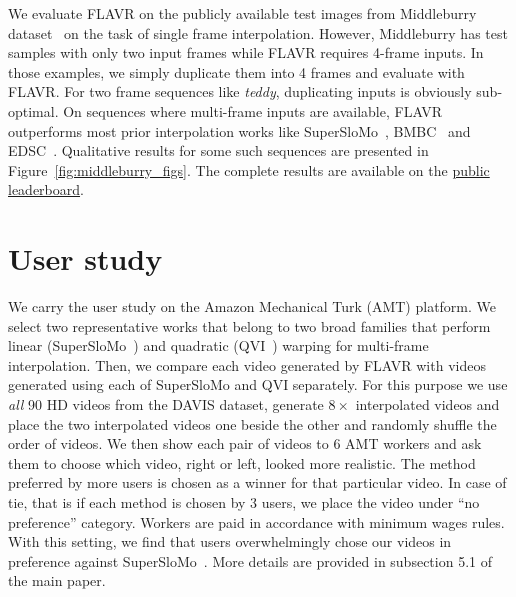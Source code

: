 \documentclass[10pt,twocolumn,letterpaper]{article}
\newcommand{\figref}[1]{Figure~\ref{#1}}
\newcommand{\red}[1]{{#1}}
\newcommand{\Ours}{FLAVR}
\newcommand{\twox}{$2\times$}
\newcommand{\eightx}{$8\times$}
\begin{document}
\begin{figure*}[t]
\begin{center}
    \end{center}
    \caption{Interpolation results for \twox{} interpolation on Middleburry test set. The leftmost images in each row repesent the overlayed inputs. The first row in each set represents the interpolated frame, while the second row shows the error maps with respect to the ground truth. IE shows the interpolation error of the method. The interpolation errors for all the baselines are reported on the \href{https://vision.middlebury.edu/flow/eval/results/results-i1.php}{official leaderboard}.}
    \label{fig:middleburry_figs}
    \vspace{-6pt}
\end{figure*} \red{We evaluate FLAVR on the publicly available test images from Middleburry dataset~\cite{scharstein2014high} on the task of single frame interpolation. However, Middleburry has test samples with only two input frames while FLAVR requires 4-frame inputs. In those examples, we simply duplicate them into 4 frames and evaluate with FLAVR. For two frame sequences like \textit{teddy}, duplicating inputs is obviously sub-optimal. On sequences where multi-frame inputs are available, FLAVR outperforms most prior interpolation works like SuperSloMo~\cite{jiang2018super}, BMBC~\cite{park2020bmbc} and EDSC~\cite{cheng2020multiple}. Qualitative results for some such sequences are presented in \figref{fig:middleburry_figs}. 
The complete results are available on the \href{https://vision.middlebury.edu/flow/eval/results/results-i1.php}{public leaderboard}}.

\section{User study}
\label{appendix:user_study}


We carry the user study on the Amazon Mechanical Turk (AMT) platform. We select two representative works that belong to two broad families that perform linear (SuperSloMo~\cite{jiang2018super}) and quadratic (QVI~\cite{xu2019quadratic}) warping for multi-frame interpolation. Then, we compare each video generated by \Ours{} with videos generated using each of SuperSloMo and QVI separately. For this purpose we use \emph{all} 90 HD videos from the DAVIS dataset, generate \eightx{} interpolated videos and place the two interpolated videos one beside the other and randomly shuffle the order of videos. We then show each pair of videos to 6 AMT workers and ask them to choose which video, right or left, looked more realistic. The method preferred by more users is chosen as a winner for that particular video. In case of tie, that is if each method is chosen by 3 users, we place the video under ``no preference'' category. Workers are paid in accordance with minimum wages rules. With this setting, we find that users overwhelmingly chose our videos in preference against SuperSloMo~\cite{jiang2018super}. More details are provided in subsection 5.1 of the main paper.
\end{document}
